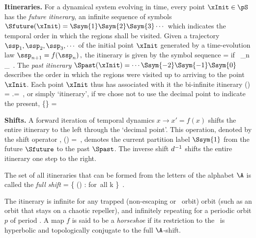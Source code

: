 {\bf Itineraries.}
For a dynamical system evolving in time,
every {\statesp} point $\xInit \in \pS$ has the {\em future itinerary},
an infinite sequence of symbols
$\Sfuture(\xInit)=\Ssym{1}\Ssym{2}\Ssym{3}\cdots$ which indicates the
temporal order in which the regions shall be visited. Given a trajectory
$\ssp_1,\ssp_2,\ssp_3,\cdots$ of the initial point $\xInit$ generated
by a time-evolution law
\( %
   \ssp_{n+1}=f(\ssp_n)
\,,
\) %
the itinerary is given by the symbol sequence
\beq
    = \Ssym{} \qquad \mbox{if\ } \qquad  \ssp_n \in \pS_{\Ssym{}}
 \,.
The {\em past itinerary} $\Spast(\xInit)=\cdots\Ssym{-2}
\Ssym{-1}\Ssym{0} $ describes the order in which the regions were visited
up to arriving to the point $\xInit$. Each point $\xInit$ thus has
associated with it the bi-infinite itinerary
\beq
\Sbiinf(\xInit) %
        = \Spast.\Sfuture  =
\,,
or simply `itinerary', if we chose not to use the decimal point
to indicate the present,
\beq
   \{\Ssym{\zeit}\} = \cdots{} \cdots
{}


{\bf Shifts.}
A forward iteration of temporal dynamics $x\rightarrow x' = f(x)$ shifts
the entire itinerary to the left through the `decimal point'. This
operation, denoted by the shift operator \shift{},
\beq
   \shift{}()
     =  
\,,
demotes the current partition label $\Ssym{1}$ from the future $\Sfuture$
to the past $\Spast$.
The inverse shift $d{}^{-1}$ shifts the entire itinerary one step
to the right.

The set of all itineraries that can be formed from the letters of the
alphabet $\A$ is called the {\em full shift}
\beq
\hat{\AdmItnr} = \{ ()
              :  \in \A \quad \mbox{for all} \quad k \in  \integers \}
\,.

The itinerary is infinite for any trapped (non-escaping or \nws\ orbit) orbit
(such as an orbit that stays on a chaotic
repeller), and infinitely repeating for a periodic orbit $p$ of period .
A map $f$ is said to be a \emph{horseshoe} if its restriction to the \nws\ is
hyperbolic and topologically conjugate to the full $\A$-shift.

